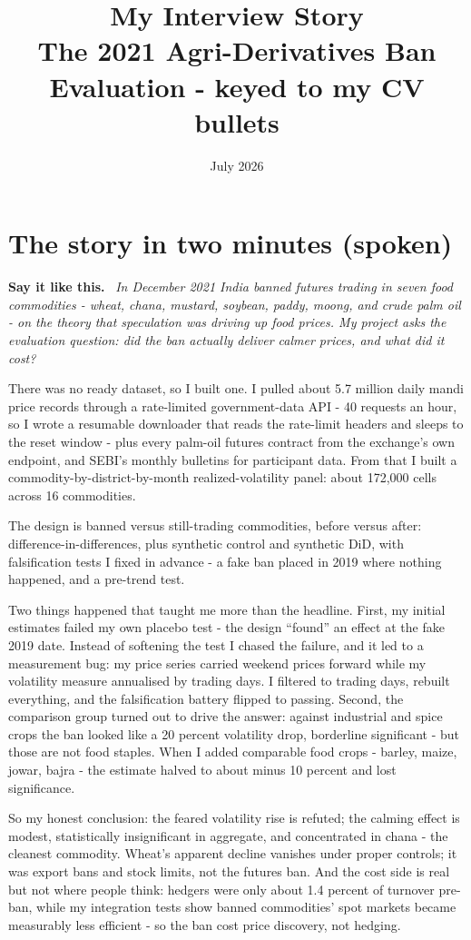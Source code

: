 \documentclass[11pt]{article}
\title{\textbf{My Interview Story}\\[4pt]\large The 2021 Agri-Derivatives Ban Evaluation - keyed to my CV bullets}
\author{}\date{July 2026}
\newenvironment{say}{\begin{framed}\noindent\textbf{Say it like this.}\ \itshape}{\end{framed}}
\begin{document}
\maketitle

\section{The story in two minutes (spoken)}

\begin{say}
In December 2021 India banned futures trading in seven food commodities - wheat, chana,
mustard, soybean, paddy, moong, and crude palm oil - on the theory that speculation was
driving up food prices. My project asks the evaluation question: did the ban actually
deliver calmer prices, and what did it cost?

There was no ready dataset, so I built one. I pulled about 5.7 million daily mandi price
records through a rate-limited government-data API - 40 requests an hour, so I wrote a
resumable downloader that reads the rate-limit headers and sleeps to the reset window -
plus every palm-oil futures contract from the exchange's own endpoint, and SEBI's monthly
bulletins for participant data. From that I built a commodity-by-district-by-month
realized-volatility panel: about 172{,}000 cells across 16 commodities.

The design is banned versus still-trading commodities, before versus after:
difference-in-differences, plus synthetic control and synthetic DiD, with falsification
tests I fixed in advance - a fake ban placed in 2019 where nothing happened, and a
pre-trend test.

Two things happened that taught me more than the headline. First, my initial estimates
failed my own placebo test - the design ``found'' an effect at the fake 2019 date. Instead
of softening the test I chased the failure, and it led to a measurement bug: my price
series carried weekend prices forward while my volatility measure annualised by trading
days. I filtered to trading days, rebuilt everything, and the falsification battery
flipped to passing. Second, the comparison group turned out to drive the answer: against
industrial and spice crops the ban looked like a 20 percent volatility drop, borderline
significant - but those are not food staples. When I added comparable food crops - barley,
maize, jowar, bajra - the estimate halved to about minus 10 percent and lost significance.

So my honest conclusion: the feared volatility rise is refuted; the calming effect is
modest, statistically insignificant in aggregate, and concentrated in chana - the cleanest
commodity. Wheat's apparent decline vanishes under proper controls; it was export bans and
stock limits, not the futures ban. And the cost side is real but not where people think:
hedgers were only about 1.4 percent of turnover pre-ban, while my integration tests show
banned commodities' spot markets became measurably less efficient - so the ban cost price
discovery, not hedging.
\end{say}
\end{document}
